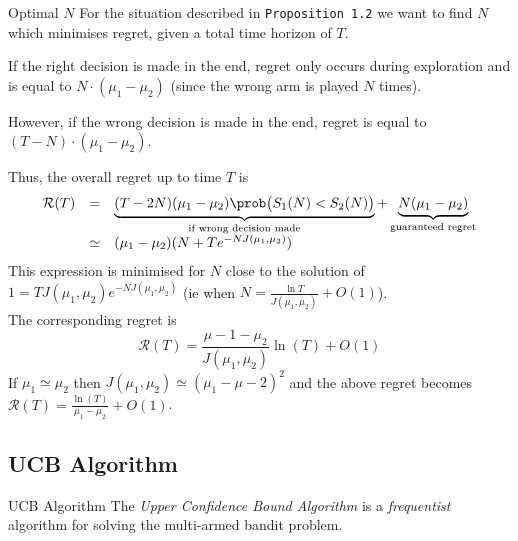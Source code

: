 \documentclass[11pt,a4paper]{article}
\begin{document}
  \begin{proposition}{Optimal $N$}
    For the situation described in \texttt{Proposition 1.2} we want to find $N$ which minimises regret, given a total time horizon of $T$.
    \par If the right decision is made in the end, regret only occurs during exploration and is equal to $N\cdot(\mu_1-\mu_2)$ (since the wrong arm is played $N$ times).
    \par However, if the wrong decision is made in the end, regret is equal to $(T-N)\cdot(\mu_1-\mu_2)$.
    \par Thus, the overall regret up to time $T$ is
    \[\begin{array}{rcl}
      \mathcal{R}(T)&=&\underbrace{(T-2N)(\mu_1-\mu_2)\prob\big(S_1(N)<S_2(N)\big)}_{\tiny\text{if wrong decision made}}+\underbrace{N(\mu_1-\mu_2)}_{\tiny\text{guaranteed regret}}\\
      &\simeq&(\mu_1-\mu_2)(N+Te^{-NJ(\mu_1,\mu_2)})
    \end{array}\]
    This expression is minimised for $N$ close to the solution of $1=TJ(\mu_1,\mu_2)e^{-NJ(\mu_1,\mu_2)}$ (ie when $N=\frac{\ln T}{J(\mu_1,\mu_2)}+O(1)$).\\
    The corresponding regret is
    \[ \mathcal{R}(T)=\frac{\mu-1-\mu_2}{J(\mu_1,\mu_2)}\ln(T)+O(1) \]
    If $\mu_1\simeq\mu_2$ then $J(\mu_1,\mu_2)\simeq(\mu_1-\mu-2)^2$ and the above regret becomes $\mathcal{R}(T)=\frac{\ln(T)}{\mu_1-\mu_2}+O(1)$.
  \end{proposition}

\subsection{UCB Algorithm}

  \begin{remark}{UCB Algorithm}
    The \textit{Upper Confidence Bound Algorithm} is a \textit{frequentist} algorithm for solving the multi-armed bandit problem.
  \end{remark}
\end{document}

